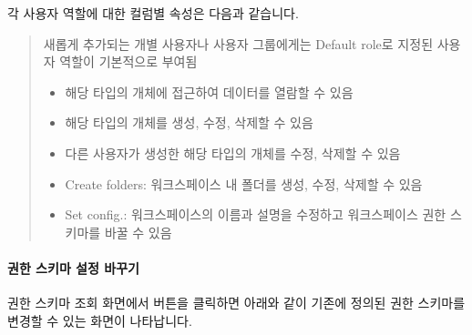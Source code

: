 \documentclass[letterpaper,10pt,english]{sphinxmanual}
\begin{document}
각 사용자 역할에 대한 컬럼별 속성은 다음과 같습니다.
\begin{quote}


새롭게 추가되는 개별 사용자나 사용자 그룹에게는 Default role로 지정된 사용자 역할이 기본적으로 부여됨

\begin{itemize}
\item {} 
 해당 타입의 개체에 접근하여 데이터를 열람할 수 있음

\item {} 
 해당 타입의 개체를 생성, 수정, 삭제할 수 있음

\item {} 
 다른 사용자가 생성한 해당 타입의 개체를 수정, 삭제할 수 있음

\end{itemize}

\begin{itemize}
\item {} 
Create folders: 워크스페이스 내 폴더를 생성, 수정, 삭제할 수 있음

\item {} 
Set config.: 워크스페이스의 이름과 설명을 수정하고 워크스페이스 권한 스키마를 바꿀 수 있음

\end{itemize}
\end{quote}


\paragraph{권한 스키마 설정 바꾸기}
\label{\detokenize{discovery/part03/shared_workspace:id7}}
권한 스키마 조회 화면에서  버튼을 클릭하면 아래와 같이 기존에 정의된 권한 스키마를 변경할 수 있는 화면이 나타납니다.
\begin{quote}

\begin{figure}[H]
\centering

\noindent{}
\end{figure}
\end{quote}
\end{document}
